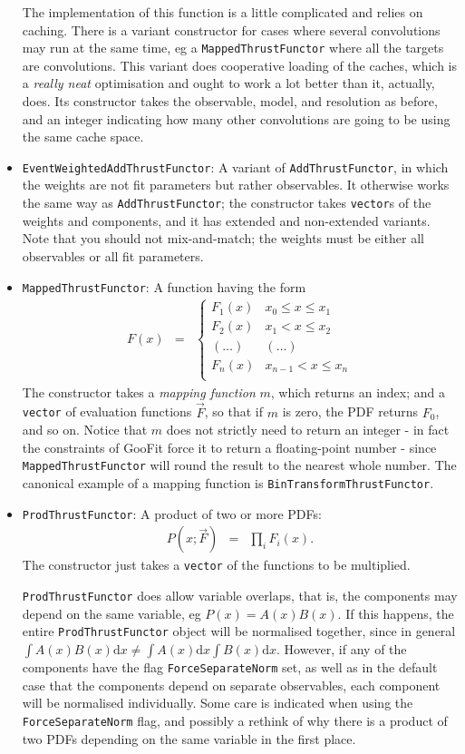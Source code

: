 \documentclass[12pt,pdflatex]{article}
\begin{document}
\begin{itemize}
The implementation of this function is a little complicated and relies on caching.
There is a variant constructor for cases where several convolutions may run at the same
time, eg a \texttt{MappedThrustFunctor} where all the targets are convolutions. This
variant does cooperative loading of the caches, which is a \emph{really neat} optimisation
and ought to work a lot better than it, actually, does. Its constructor takes the observable, 
model, and resolution as before, and an integer indicating how many other convolutions are going
to be using the same cache space. 
\item \texttt{EventWeightedAddThrustFunctor}: A variant of \texttt{AddThrustFunctor}, 
in which the weights are not fit parameters but rather observables. It otherwise
works the same way as \texttt{AddThrustFunctor}; the constructor takes \texttt{vector}s
of the weights and components, and it has extended and non-extended variants. Note that
you should not mix-and-match; the weights must be either all observables or all fit parameters.
\item \texttt{MappedThrustFunctor}: A function having the form
\begin{eqnarray}
F(x) &=& \left\{ \begin{matrix}
F_1(x)   & x_0 \le x \le x_1 \\
F_2(x)   & x_1 < x \le x_2 \\
(\ldots) & (\ldots)        \\
F_n(x)   & x_{n-1} < x \le x_n \\
\end{matrix}
\right. 
\end{eqnarray}
The constructor takes a \emph{mapping function} $m$, which returns an index;
and a \texttt{vector} of evaluation functions $\vec F$, so that if $m$ is zero, 
the PDF returns $F_0$, and so on. Notice that $m$ does not strictly need to 
return an integer - in fact the constraints of GooFit force it to return a floating-point
number - since \texttt{MappedThrustFunctor} will round the result to the nearest
whole number. The canonical example of a mapping function is \texttt{BinTransformThrustFunctor}.
\item \texttt{ProdThrustFunctor}: A product of two or more PDFs:
\begin{eqnarray}
P(x; \vec F) &=& \prod\limits_i F_i(x).
\end{eqnarray}
The constructor just takes a \texttt{vector} of the functions to be multiplied. 

\texttt{ProdThrustFunctor} does allow variable overlaps, that is, the components
may depend on the same variable, eg $P(x) = A(x)B(x)$. If this happens, the entire
\texttt{ProdThrustFunctor} object will be normalised together, since in general
$\int A(x)B(x) \mathrm{d}x \ne \int A(x) \mathrm{d}x \int B(x) \mathrm{d}x$.
However, if any of the components have the flag \texttt{ForceSeparateNorm} set,
as well as in the default case that the components depend on separate observables, 
each component will be normalised individually. Some care is indicated
when using the \texttt{ForceSeparateNorm} flag, and possibly a rethink of why there
is a product of two PDFs depending on the same variable in the first place. 
\end{itemize}
\end{document}
